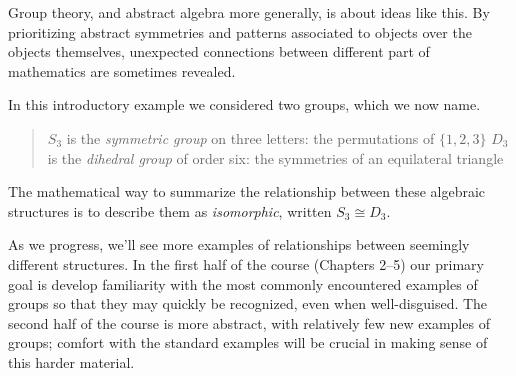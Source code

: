 \begin{tcolorbox}[exstyle]
	Group theory, and abstract algebra more generally, is about ideas like this. By prioritizing abstract symmetries and patterns associated to objects over the objects themselves, unexpected connections between different part of mathematics are sometimes revealed.
	
	 In this introductory example we considered two groups, which we now name.
	\begin{quote}
		$S_3$ is the \emph{symmetric group} on three letters: the permutations of $\{1,2,3\}$\smallbreak
		$D_3$ is the \emph{dihedral group} of order six: the symmetries of an equilateral triangle
	\end{quote}
	The mathematical way to summarize the relationship between these algebraic structures is to describe them as \emph{isomorphic},\footnotemark{} written $S_3\cong D_3$.
\end{tcolorbox}

As we progress, we'll see more examples of relationships between seemingly different structures. In the first half of the course (Chapters 2--5) our primary goal is develop familiarity with the most commonly encountered examples of groups so that they may quickly be recognized, even when well-disguised. The second half of the course is more abstract, with relatively few new examples of groups; comfort with the standard examples will be crucial in making sense of this harder material. 

